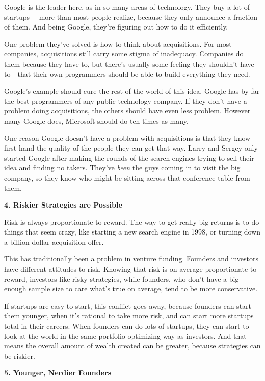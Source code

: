 \documentclass[12pt]{book}
\begin{document}
Google is the leader here, as in so many areas of technology. They buy a
lot of startups--- more than most people realize, because they only
announce a fraction of them. And being Google, they're figuring out how
to do it efficiently.

One problem they've solved is how to think about acquisitions. For most
companies, acquisitions still carry some stigma of inadequacy. Companies
do them because they have to, but there's usually some feeling they
shouldn't have to---that their own programmers should be able to build
everything they need.

Google's example should cure the rest of the world of this idea. Google
has by far the best programmers of any public technology company. If
they don't have a problem doing acquisitions, the others should have
even less problem. However many Google does, Microsoft should do ten
times as many.

One reason Google doesn't have a problem with acquisitions is that they
know first-hand the quality of the people they can get that way. Larry
and Sergey only started Google after making the rounds of the search
engines trying to sell their idea and finding no takers. They've
\emph{been} the guys coming in to visit the big company, so they know
who might be sitting across that conference table from them.

\textbf{4. Riskier Strategies are Possible}

Risk is always proportionate to reward. The way to get really big
returns is to do things that seem crazy, like starting a new search
engine in 1998, or turning down a billion dollar acquisition offer.

This has traditionally been a problem in venture funding. Founders and
investors have different attitudes to risk. Knowing that risk is on
average proportionate to reward, investors like risky strategies, while
founders, who don't have a big enough sample size to care what's true on
average, tend to be more conservative.

If startups are easy to start, this conflict goes away, because founders
can start them younger, when it's rational to take more risk, and can
start more startups total in their careers. When founders can do lots of
startups, they can start to look at the world in the same
portfolio-optimizing way as investors. And that means the overall amount
of wealth created can be greater, because strategies can be riskier.

\textbf{5. Younger, Nerdier Founders}
\end{document}
